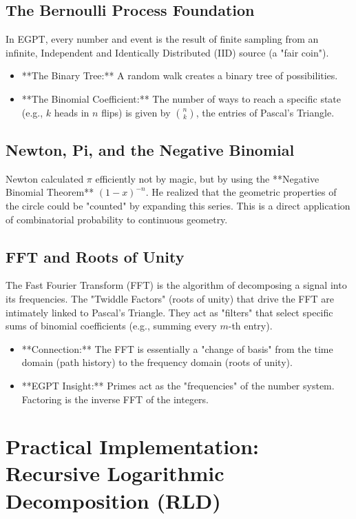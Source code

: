 \documentclass[11pt, a4paper]{article}
\begin{document}
\subsection{The Bernoulli Process Foundation}
In EGPT, every number and event is the result of finite sampling from an infinite, Independent and Identically Distributed (IID) source (a "fair coin").
\begin{itemize}
    \item **The Binary Tree:** A random walk creates a binary tree of possibilities.
    \item **The Binomial Coefficient:** The number of ways to reach a specific state (e.g., $k$ heads in $n$ flips) is given by $\binom{n}{k}$, the entries of Pascal's Triangle.
\end{itemize}

\subsection{Newton, Pi, and the Negative Binomial}
Newton calculated $\pi$ efficiently not by magic, but by using the **Negative Binomial Theorem** $(1-x)^{-n}$. He realized that the geometric properties of the circle could be "counted" by expanding this series. This is a direct application of combinatorial probability to continuous geometry.

\subsection{FFT and Roots of Unity}
The Fast Fourier Transform (FFT) is the algorithm of decomposing a signal into its frequencies. The "Twiddle Factors" (roots of unity) that drive the FFT are intimately linked to Pascal's Triangle. They act as "filters" that select specific sums of binomial coefficients (e.g., summing every $m$-th entry).
\begin{itemize}
    \item **Connection:** The FFT is essentially a "change of basis" from the time domain (path history) to the frequency domain (roots of unity).
    \item **EGPT Insight:** Primes act as the "frequencies" of the number system. Factoring is the inverse FFT of the integers.
\end{itemize}

\section{Practical Implementation: Recursive Logarithmic Decomposition (RLD)}
\end{document}
